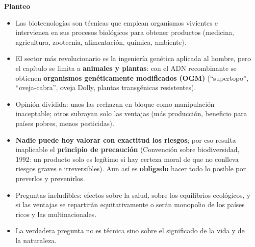 \documentclass[10pt,a4paper]{article}
\begin{document}
\medskip\noindent \textbf{Planteo}\par\nopagebreak
\begin{itemize}
\item Las biotecnologías son técnicas que emplean organismos vivientes e intervienen en sus procesos biológicos para obtener productos (medicina, agricultura, zootecnia, alimentación, química, ambiente).
\item El sector más revolucionario es la ingeniería genética aplicada al hombre, pero el capítulo se limita a \textbf{animales y plantas}: con el ADN recombinante se obtienen \textbf{organismos genéticamente modificados (OGM)} (``supertopo'', ``oveja-cabra'', oveja Dolly, plantas transgénicas resistentes).
\item Opinión dividida: unos las rechazan en bloque como manipulación inaceptable; otros subrayan solo las ventajas (más producción, beneficio para países pobres, menos pesticidas).
\item \textbf{Nadie puede hoy valorar con exactitud los riesgos}; por eso resulta inaplicable el \textbf{principio de precaución} (Convención sobre biodiversidad, 1992: un producto solo es legítimo si hay certeza moral de que no conlleva riesgos graves e irreversibles). Aun así es \textbf{obligado} hacer todo lo posible por preverlos y prevenirlos.
\item Preguntas ineludibles: efectos sobre la salud, sobre los equilibrios ecológicos, y si las ventajas se repartirán equitativamente o serán monopolio de los países ricos y las multinacionales.
\item La verdadera pregunta no es técnica sino sobre el significado de la vida y de la naturaleza.
\end{itemize}
\end{document}

